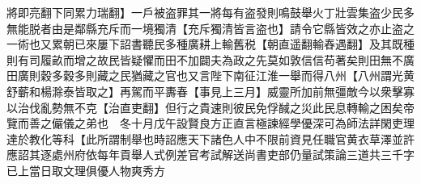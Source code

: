 將即亮翻下同累力瑞翻】一戶被盗罪其一將每有盗發則鳴鼓舉火丁壯雲集盗少民多無能脱者由是鄰縣充斥而一境獨清【充斥獨清皆言盗也】請令它縣皆效之亦止盗之一術也又累朝已來屢下詔書聽民多種廣耕上輸舊税【朝直遥翻輸舂遇翻】及其既種則有司履畝而增之故民皆疑懼而田不加闢夫為政之先莫如敦信信苟著矣則田無不廣田廣則穀多穀多則藏之民猶藏之官也又言陛下南征江淮一舉而得八州【八州謂光黄舒蘄和楊滁泰皆取之】再駕而平夀春【事見上三月】威靈所加前無彊敵今以衆擊寡以治伐亂勢無不克【治直吏翻】但行之貴速則彼民免俘馘之災此民息轉輸之困矣帝覽而善之儼儀之弟也　冬十月戊午設賢良方正直言極諫經學優深可為師法詳閑吏理達於教化等科【此所謂制舉也時詔應天下諸色人中不限前資見任職官黄衣草澤並許應詔其逐處州府依每年貢舉人式例差官考試解送尚書吏部仍量試策論三道共三千字已上當日取文理俱優人物爽秀方